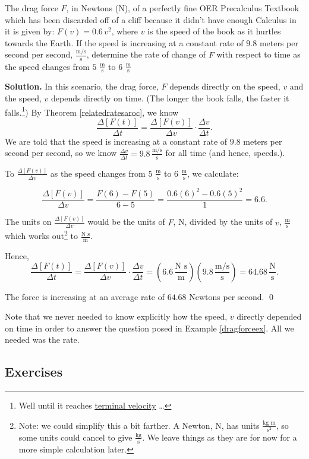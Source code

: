 \begin{ex}\label{dragforceex} The drag force $F$, in Newtons (N), of a perfectly fine OER Precalculus Textbook which has been discarded off of a cliff because it didn't have enough Calculus in it is given by:  $F(v) = 0.6 \, v^2$, where $v$ is the speed of the book as it hurtles towards the Earth. If the speed is increasing at a constant rate of $9.8$ meters per second per second, $\frac{\text{m/s}}{\text{s}}$, determine the rate of change of $F$ with respect to time as the speed changes from $5$ $\frac{\text{m}}{\text{s}}$ to $6$ $\frac{\text{m}}{\text{s}}$

\medskip

{\bf Solution.} In this scenario, the drag force, $F$ depends directly on the speed, $v$ and the speed, $v$ depends directly on time.  (The longer the book falls, the faster it falls.\footnote{Well until it reaches \href{https://en.wikipedia.org/wiki/Terminal_velocity}{\underline{terminal velocity}} \ldots})  By Theorem \ref{relatedratesaroc}, we know \[ \dfrac{\Delta[F(t)]}{\Delta t} = \dfrac{\Delta[F(v)]}{\Delta v} \cdot \dfrac{\Delta v}{\Delta t}.\]
We are told that the speed is increasing at a constant rate of $9.8$ meters per second per second, so we know $\frac{\Delta v}{\Delta t} = 9.8 \, \frac{\text{m/s}}{\text{s}}$ for all time (and hence, speeds.).  

\medskip

To $\frac{\Delta[F(v)]}{\Delta v}$ as the speed changes from $5$ $\frac{\text{m}}{\text{s}}$ to $6$ $\frac{\text{m}}{\text{s}}$, we calculate:

\[ \dfrac{\Delta[F(v)]}{\Delta v} = \dfrac{F(6) - F(5)}{6-5} = \dfrac{0.6 (6)^2 - 0.6 (5)^2}{1} = 6.6.\]

The units on $\frac{\Delta[F(v)]}{\Delta v}$ would be the units of $F$, N, divided by the units of $v$, $\frac{\text{m}}{\text{s}}$ which works out\footnote{Note:  we could simplify this a bit farther.  A Newton, N, has units $\frac{\text{kg m}}{\text{s}^2}$, so some units could cancel  to give   $\frac{\text{kg}}{\text{s}}$.  We leave things as they are for now for a more simple calculation later.} to $\frac{\text{N s}}{\text{m}}$.  
\medskip

Hence, \[ \dfrac{\Delta[F(t)]}{\Delta t} =  \dfrac{\Delta[F(v)]}{\Delta v} \cdot \dfrac{\Delta v}{\Delta t} = \left(6.6 \,  \frac{\text{N s}}{\text{m}} \right) \left( 9.8  \, \frac{\text{m/s}}{\text{s}} \right) = 64.68 \, \frac{\text{N}}{\text{s}} .\]

The force is increasing at an average rate of $64.68$ Newtons per second.  \qed

\end{ex}

Note that we never needed to know explicitly how the speed, $v$ directly depended on time in order to answer the question posed in Example \ref{dragforceex}. All we needed was the rate.  

\newpage

\subsection{Exercises}


\closegraphsfile
